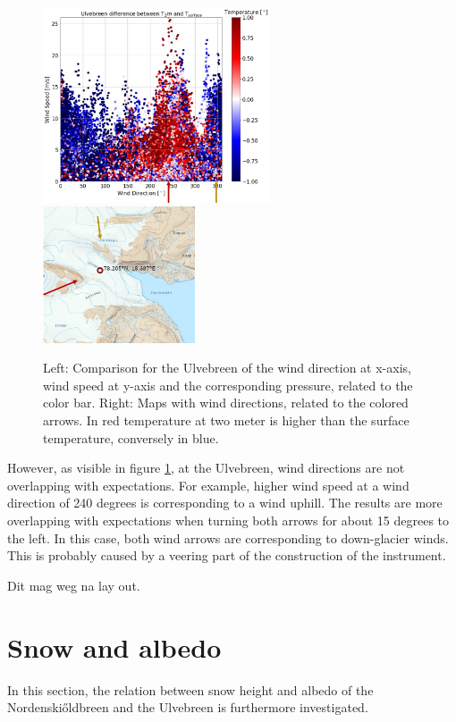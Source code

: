 \documentclass[11pt]{report}
\begin{document}
\begin{figure}[h]
\includegraphics[scale=1, width=0.6\textwidth]{norde-WS-WD.jpg}
\includegraphics[scale=1, width=0.40\textwidth]{ulve-WS-WD-rose-1.jpg}
\caption{Left: Comparison for the Ulvebreen of the wind direction at x-axis, wind speed at y-axis and the corresponding pressure, related to the color bar. Right: Maps with wind directions, related to the colored arrows. In red temperature at two meter is higher than the surface temperature, conversely in blue.}
\label{fig:PRulve}
\end{figure}

However, as visible in figure \ref{fig:PRulve}, at the Ulvebreen, wind directions are not overlapping with expectations. For example, higher wind speed at a wind direction of 240 degrees is corresponding to a wind uphill. The results are more overlapping with expectations when turning both arrows for about 15 degrees to the left. In this case, both wind arrows are corresponding to down-glacier winds. This is probably caused by a veering part of the construction of the instrument.

\newpage
Dit mag weg na lay out.
\newpage
\section{Snow and albedo}\label{sec:rad}
In this section, the relation between snow height and albedo of the Nordenski\H{o}ldbreen and the Ulvebreen is furthermore investigated.
\end{document}
